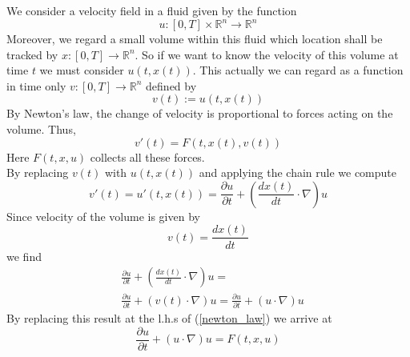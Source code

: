 \documentclass[17pt]{extarticle}
\begin{document}
	We consider a velocity field in a fluid given by the function 
	$$
	u:[0,T]\times\mathbb{R}^n\rightarrow\mathbb{R}^n
	$$
	Moreover, we regard a small volume within this fluid which location shall be tracked by $x:[0,T]\rightarrow\mathbb{R}^n$.
	So if we want to know the velocity of this volume at time $t$ we must consider $u(t, x(t))$. This actually we can regard as a function in time only $v:[0,T]\rightarrow\mathbb{R}^n$ defined by 
	$$
	v(t):=u(t, x(t))
	$$
	By Newton's law, the change of velocity is proportional to forces acting on the volume. Thus,
	\begin{equation} \label{newton_law}
	v'(t)=F(t,x(t), v(t))
	\end{equation}
	Here $F(t, x, u)$ collects all these forces.\\
	By replacing $v(t)$ with $u(t, x(t))$ and applying the chain rule we compute
	\begin{equation*}
	v'(t)=u'(t, x(t))=\frac{\partial u}{\partial t}+
	\left(\frac{d x(t)}{dt}\cdot \nabla \right)u
	\end{equation*}
	Since velocity of the volume is given by
	$$
	v(t)=\frac{d x(t)}{dt}
	$$
	we find
	\begin{align*}
	&	\frac{\partial u}{\partial t}+
		\left(\frac{d x(t)}{dt}\cdot \nabla \right)u=\\
	&\frac{\partial u}{\partial t}+
	\left(v(t)\cdot \nabla \right)u=\frac{\partial u}{\partial t}+
	\left(u\cdot \nabla \right)u
	\end{align*}
	By replacing this result at the l.h.s of (\ref{newton_law}) we arrive at
	$$
	\frac{\partial u}{\partial t}+
	\left(u\cdot \nabla \right)u=F(t,x, u)
	$$	
\end{document}
